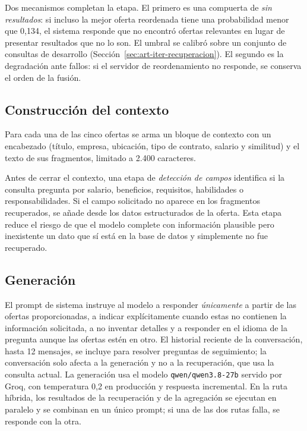 Dos mecanismos completan la etapa. El primero es una compuerta de \emph{sin resultados}: si incluso la mejor oferta reordenada tiene una probabilidad menor que 0,134, el sistema responde que no encontró ofertas relevantes en lugar de presentar resultados que no lo son. El umbral se calibró sobre un conjunto de consultas de desarrollo (Sección~\ref{sec:art-iter-recuperacion}). El segundo es la degradación ante fallos: si el servidor de reordenamiento no responde, se conserva el orden de la fusión.

\subsection{Construcción del contexto}

Para cada una de las cinco ofertas se arma un bloque de contexto con un encabezado (título, empresa, ubicación, tipo de contrato, salario y similitud) y el texto de sus fragmentos, limitado a 2.400 caracteres.

Antes de cerrar el contexto, una etapa de \emph{detección de campos} identifica si la consulta pregunta por salario, beneficios, requisitos, habilidades o responsabilidades. Si el campo solicitado no aparece en los fragmentos recuperados, se añade desde los datos estructurados de la oferta. Esta etapa reduce el riesgo de que el modelo complete con información plausible pero inexistente un dato que sí está en la base de datos y simplemente no fue recuperado.

\subsection{Generación}

El prompt de sistema instruye al modelo a responder \emph{únicamente} a partir de las ofertas proporcionadas, a indicar explícitamente cuando estas no contienen la información solicitada, a no inventar detalles y a responder en el idioma de la pregunta aunque las ofertas estén en otro. El historial reciente de la conversación, hasta 12 mensajes, se incluye para resolver preguntas de seguimiento; la conversación solo afecta a la generación y no a la recuperación, que usa la consulta actual. La generación usa el modelo \texttt{qwen/qwen3.8-27b} servido por Groq, con temperatura 0,2 en producción y respuesta incremental. En la ruta híbrida, los resultados de la recuperación y de la agregación se ejecutan en paralelo y se combinan en un único prompt; si una de las dos rutas falla, se responde con la otra.

